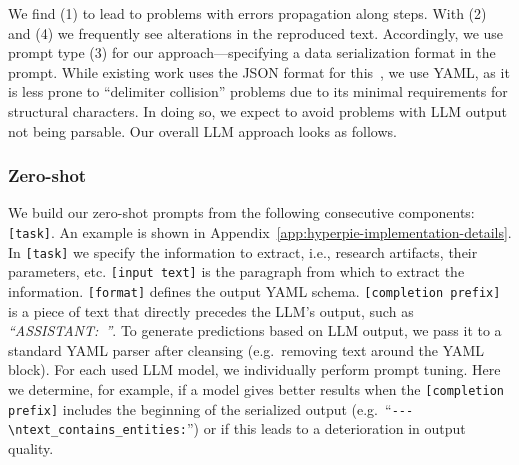 We find (1) to lead to problems with errors propagation along steps. With (2) and (4) we frequently see alterations in the reproduced text. Accordingly, we use prompt type (3) for our approach---specifying a data serialization format in the prompt.
While existing work uses the JSON format for this~\cite{Dunn2022}, we use YAML, as it is less prone to ``delimiter collision'' problems due to its minimal requirements for structural characters. 
In doing so, we expect to avoid problems with LLM output not being parsable. Our overall LLM approach looks as follows.
%
%

\subsubsection{Zero-shot} We build our zero-shot prompts from the following consecutive components: \texttt{[task]\allowbreak[format]}.
An example is shown in Appendix~\ref{app:hyperpie-implementation-details}.
In \texttt{[task]} we specify the information to extract, i.e., research artifacts, their parameters, etc. \texttt{[input text]} is the paragraph from which to extract the information. \texttt{[format]} defines the output YAML schema. \texttt{[completion prefix]} is a piece of text that directly precedes the LLM's output, such as \textit{``ASSISTANT:~''}.
%
%
To generate predictions based on LLM output, we pass it to a standard YAML parser after cleansing (e.g.\ removing text around the YAML block).
%
%
For each used LLM model, we individually perform prompt tuning. Here we determine, for example, if a model gives better results when the \texttt{[completion prefix]} includes the beginning of the serialized output (e.g.\ ``\texttt{-{}-{}-\allowbreak\textbackslash n\allowbreak text\_\allowbreak contains\_\allowbreak entities:}'') or if this leads to a deterioration in output quality.

